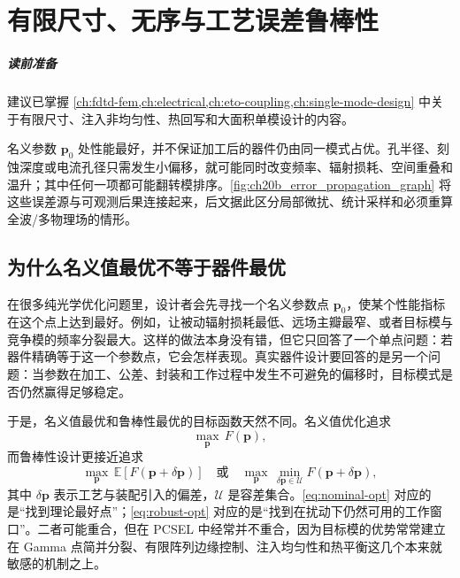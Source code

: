 ﻿%
\chapter{有限尺寸、无序与工艺误差鲁棒性}
\label{ch:robustness}

\paragraph{读前准备}
建议已掌握 \cref{ch:fdtd-fem,ch:electrical,ch:eto-coupling,ch:single-mode-design} 中关于有限尺寸、注入非均匀性、热回写和大面积单模设计的内容。


名义参数 $\bm p_0$ 处性能最好，并不保证加工后的器件仍由同一模式占优。孔半径、刻蚀深度或电流孔径只需发生小偏移，就可能同时改变频率、辐射损耗、空间重叠和温升；其中任何一项都可能翻转模排序。\cref{fig:ch20b_error_propagation_graph} 将这些误差源与可观测后果连接起来，后文据此区分局部微扰、统计采样和必须重算全波/多物理场的情形。

\section{为什么名义值最优不等于器件最优}
在很多纯光学优化问题里，设计者会先寻找一个名义参数点 $\bm{p}_0$，使某个性能指标在这个点上达到最好。例如，让被动辐射损耗最低、远场主瓣最窄、或者目标模与竞争模的频率分裂最大。这样的做法本身没有错，但它只回答了一个单点问题：若器件精确等于这一个参数点，它会怎样表现。真实器件设计要回答的是另一个问题：当参数在加工、公差、封装和工作过程中发生不可避免的偏移时，目标模式是否仍然赢得足够稳定。

于是，名义值最优和鲁棒性最优的目标函数天然不同。名义值优化追求
\begin{equation}
\max_{\bm{p}} \, F(\bm{p}),
\label{eq:nominal-opt}
\end{equation}
而鲁棒性设计更接近追求
\begin{equation}
\max_{\bm{p}} \, \mathbb{E}[F(\bm{p}+\delta \bm{p})]
\quad\text{或}\quad
\max_{\bm{p}} \, \min_{\delta \bm{p}\in \mathcal{U}} F(\bm{p}+\delta \bm{p}),
\label{eq:robust-opt}
\end{equation}
其中 $\delta \bm{p}$ 表示工艺与装配引入的偏差，$\mathcal{U}$ 是容差集合。\cref{eq:nominal-opt} 对应的是“找到理论最好点”；\cref{eq:robust-opt} 对应的是“找到在扰动下仍然可用的工作窗口”。二者可能重合，但在 PCSEL 中经常并不重合，因为目标模的优势常常建立在 Gamma 点简并分裂、有限阵列边缘控制、注入均匀性和热平衡这几个本来就敏感的机制之上。

